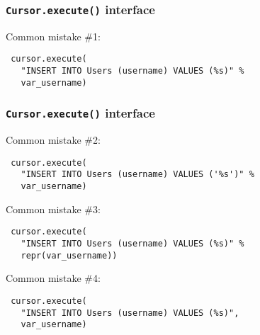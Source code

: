 \documentclass{beamer}
\begin{document}
\begin{frame}[fragile]
  \frametitle{\texttt{Cursor.execute()} interface}


\vfill
\pause









  Common mistake \#1:
\begin{verbatim}
 cursor.execute(
   "INSERT INTO Users (username) VALUES (%s)" % 
   var_username)
\end{verbatim}





\end{frame}


\begin{frame}[fragile]
  \frametitle{\texttt{Cursor.execute()} interface}


  Common mistake \#2:
\begin{verbatim}
 cursor.execute(
   "INSERT INTO Users (username) VALUES ('%s')" % 
   var_username)
\end{verbatim}

\pause

  Common mistake \#3:
\begin{verbatim}
 cursor.execute(
   "INSERT INTO Users (username) VALUES (%s)" % 
   repr(var_username))
\end{verbatim}

\end{frame}

  Common mistake \#4:
\begin{verbatim}
 cursor.execute(
   "INSERT INTO Users (username) VALUES (%s)",
   var_username)
\end{verbatim}
\end{document}
